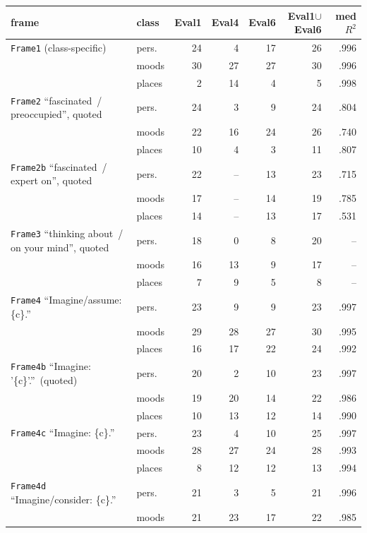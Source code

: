 \begin{table}[t]
\centering
\small
\setlength{\tabcolsep}{4pt}
\begin{tabular}{llrrrrr}
\hline
frame & class & Eval1 & Eval4 & Eval6 & Eval1$\cup$Eval6 & med $R^2$ \\
\hline
\texttt{Frame1} (class-specific)
 & pers.  & 24 & 4  & 17 & 26 & .996 \\
 & moods  & 30 & 27 & 27 & 30 & .996 \\
 & places & 2  & 14 & 4  & 5  & .998 \\
\texttt{Frame2} ``fascinated~/ preoccupied'', quoted
 & pers.  & 24 & 3  & 9  & 24 & .804 \\
 & moods  & 22 & 16 & 24 & 26 & .740 \\
 & places & 10 & 4  & 3  & 11 & .807 \\
\texttt{Frame2b} ``fascinated~/ expert on'', quoted
 & pers.  & 22 & -- & 13 & 23 & .715 \\
 & moods  & 17 & -- & 14 & 19 & .785 \\
 & places & 14 & -- & 13 & 17 & .531 \\
\texttt{Frame3} ``thinking about~/ on your mind'', quoted
 & pers.  & 18 & 0  & 8  & 20 & --  \\
 & moods  & 16 & 13 & 9  & 17 & --  \\
 & places & 7  & 9  & 5  & 8  & --  \\
\texttt{Frame4} ``Imagine/assume: \{c\}.''
 & pers.  & 23 & 9  & 9  & 23 & .997 \\
 & moods  & 29 & 28 & 27 & 30 & .995 \\
 & places & 16 & 17 & 22 & 24 & .992 \\
\texttt{Frame4b} ``Imagine: '\{c\}'.''\ (quoted)
 & pers.  & 20 & 2  & 10 & 23 & .997 \\
 & moods  & 19 & 20 & 14 & 22 & .986 \\
 & places & 10 & 13 & 12 & 14 & .990 \\
\texttt{Frame4c} ``Imagine: \{c\}.''
 & pers.  & 23 & 4  & 10 & 25 & .997 \\
 & moods  & 28 & 27 & 24 & 28 & .993 \\
 & places & 8  & 12 & 12 & 13 & .994 \\
\texttt{Frame4d} ``Imagine/consider: \{c\}.''
 & pers.  & 21 & 3  & 5  & 21 & .996 \\
 & moods  & 21 & 23 & 17 & 22 & .985 \\

\end{tabular}
\end{table}
